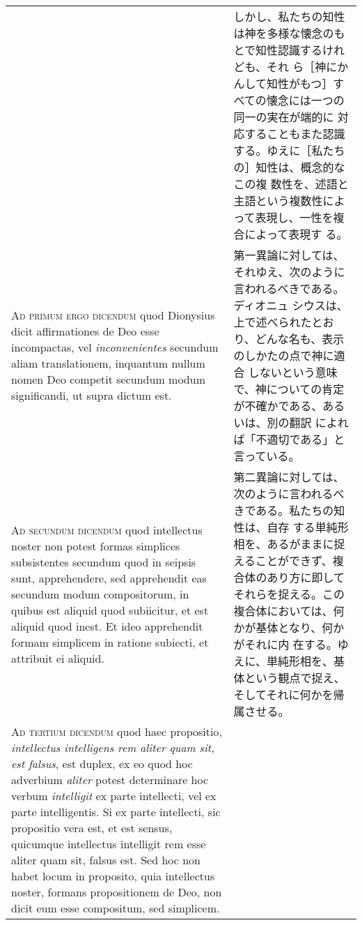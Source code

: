 \documentclass[10pt]{jsarticle} %
\begin{document}
\begin{longtable}{p{21em}p{21em}}
&

しかし、私たちの知性は神を多様な懐念のもとで知性認識するけれども、それ
ら［神にかんして知性がもつ］すべての懐念には一つの同一の実在が端的に
対応することもまた認識する。ゆえに［私たちの］知性は、概念的なこの複
数性を、述語と主語という複数性によって表現し、一性を複合によって表現す
る。


\\

{\scshape Ad primum ergo dicendum} quod Dionysius dicit affirmationes de
Deo esse incompactas, vel {\itshape inconvenientes} secundum aliam
translationem, inquantum nullum nomen Deo competit secundum modum
significandi, ut supra dictum est.


&

第一異論に対しては、それゆえ、次のように言われるべきである。ディオニュ
シウスは、上で述べられたとおり、どんな名も、表示のしかたの点で神に適合
しないという意味で、神についての肯定が不確かである、あるいは、別の翻訳
によれば「不適切である」と言っている。

\\


{\scshape Ad secundum dicendum} quod intellectus noster
non potest formas simplices subsistentes secundum quod in seipsis sunt,
apprehendere, sed apprehendit eas secundum modum compositorum, in quibus
est aliquid quod subiicitur, et est aliquid quod inest. Et ideo
apprehendit formam simplicem in ratione subiecti, et attribuit ei
aliquid.


&

第二異論に対しては、次のように言われるべきである。私たちの知性は、自存
する単純形相を、あるがままに捉えることができず、複合体のあり方に即して
それらを捉える。この複合体においては、何かが基体となり、何かがそれに内
在する。ゆえに、単純形相を、基体という観点で捉え、そしてそれに何かを帰
属させる。

\\


{\scshape Ad tertium dicendum} quod haec propositio, {\itshape
intellectus intelligens rem aliter quam sit, est falsus}, est duplex, ex
eo quod hoc adverbium {\itshape aliter} potest determinare hoc verbum
{\itshape intelligit} ex parte intellecti, vel ex parte
intelligentis. Si ex parte intellecti, sic propositio vera est, et est
sensus, quicumque intellectus intelligit rem esse aliter quam sit,
falsus est. Sed hoc non habet locum in proposito, quia intellectus
noster, formans propositionem de Deo, non dicit eum esse compositum, sed
simplicem. 


&


\end{longtable}
\end{document}
